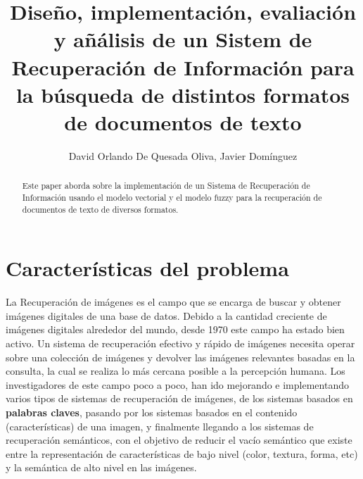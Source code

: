 \documentclass{llncs}
\begin{document}
%
\title{Diseño, implementación, evaliación y añálisis de un Sistem de Recuperación de Información para la búsqueda de distintos formatos de documentos de texto}
\author{David Orlando De Quesada Oliva, Javier Dom\'inguez}
\maketitle

\begin{abstract}
    
    Este paper aborda sobre la implementación de un Sistema de Recuperación de Información usando 
    el modelo vectorial y el modelo fuzzy para la recuperación de documentos de texto de diversos 
    formatos.

\end{abstract}

\tableofcontents
%

  



\chapter*{Caracter\'isticas del problema}
La Recuperación de im\'agenes es el campo que se encarga de buscar y obtener imágenes 
digitales de una base  de datos. Debido a la cantidad creciente de imágenes digitales 
alrededor del mundo, desde 1970 este campo ha estado bien activo. Un sistema de 
recuperación efectivo y rápido de imágenes necesita operar sobre una colección de 
imágenes y devolver las imágenes relevantes basadas en la consulta, la cual 
se realiza lo más cercana posible a la percepción humana. Los investigadores de este 
campo poco a poco, han ido mejorando e implementando varios tipos de sistemas de recuperación 
de imágenes, de los sistemas basados en \textbf{palabras claves}, pasando por los sistemas 
basados en el contenido (características) de una imagen, y finalmente llegando a los 
sistemas de recuperación semánticos, con el objetivo de reducir el vacío semántico que 
existe entre la representación de características de bajo nivel (color, textura, forma, etc) y 
la semántica de alto nivel en las imágenes.
\end{document}
